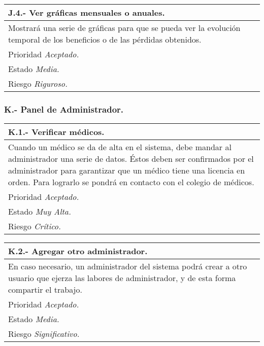 \documentclass[a4paper,oneside,11pt]{book}
\begin{document}
\begin{center}
\begin{tabulary}{15cm}{|L|}
	\hline
		\bf{J.4.- Ver gráficas mensuales o anuales.} \\
	\hline
		Mostrará una serie de gráficas para que se pueda ver la evolución temporal de los beneficios o de las pérdidas obtenidos. \\
	\hline
		Prioridad \textit{Aceptado.} \\
	\hline
		Estado \textit{Media.} \\
	\hline
		Riesgo \textit{Riguroso.} \\
	\hline
\end{tabulary}
\end{center}

\subsubsection{K.- Panel de Administrador.}

\begin{center}
\begin{tabulary}{15cm}{|L|}
	\hline
		\bf{K.1.- Verificar médicos.} \\
	\hline
		Cuando un médico se da de alta en el sistema, debe mandar al administrador una serie de datos. Éstos deben ser confirmados por el administrador para garantizar que un médico tiene una licencia en orden. Para lograrlo se pondrá en contacto con el colegio de médicos. \\
	\hline
		Prioridad \textit{Aceptado.} \\
	\hline
		Estado \textit{Muy Alta.} \\
	\hline
		Riesgo \textit{Crítico.} \\
	\hline
\end{tabulary}
\end{center}

\begin{center}
\begin{tabulary}{15cm}{|L|}
	\hline
		\bf{K.2.- Agregar otro administrador.} \\
	\hline
		En caso necesario, un administrador del sistema podrá crear a otro usuario que ejerza las labores de administrador, y de esta forma compartir el trabajo. \\
	\hline
		Prioridad \textit{Aceptado.} \\
	\hline
		Estado \textit{Media.} \\
	\hline
		Riesgo \textit{Significativo.} \\
	\hline
\end{tabulary}
\end{center}
\end{document}
